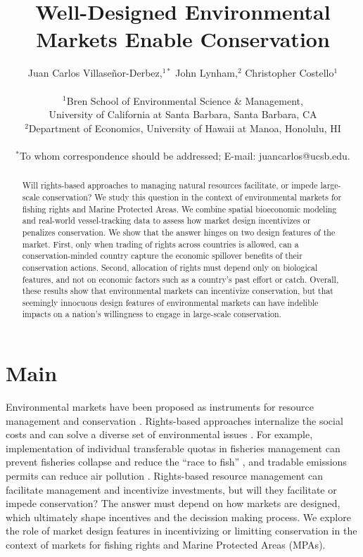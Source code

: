 \documentclass[12pt]{article}
\title{Well-Designed Environmental Markets Enable Conservation}
\author{Juan Carlos Villase\~{n}or-Derbez,$^{1\ast}$ John Lynham,$^{2}$ Christopher Costello$^{1}$\\
\\
\normalsize{$^{1}$Bren School of Environmental Science \& Management,}\\
\normalsize{University of California at Santa Barbara, Santa Barbara, CA}\\
\normalsize{$^{2}$Department of Economics, University of Hawaii at Manoa, Honolulu, HI}\\
\\
\normalsize{$^\ast$To whom correspondence should be addressed; E-mail: juancarlos@ucsb.edu.}
}
\date{}
\begin{document}

\baselineskip24pt


\maketitle



\begin{abstract}
Will rights-based approaches to managing natural resources facilitate, or impede large-scale conservation? We study this question in the context of environmental markets for fishing rights and Marine Protected Areas. We combine spatial bioeconomic modeling and real-world vessel-tracking data to assess how market design incentivizes or penalizes conservation. We show that the answer hinges on two design features of the market. First, only when trading of rights across countries is allowed, can a conservation-minded country capture the economic spillover benefits of their conservation actions. Second, allocation of rights must depend only on biological features, and not on economic factors such as a country's past effort or catch. Overall, these results show that environmental markets can incentivize conservation, but that seemingly innocuous design features of environmental markets can have indelible impacts on a nation's willingness to engage in large-scale conservation.
\end{abstract}

\clearpage

\section{Main}

Environmental markets have been proposed as instruments for resource management and conservation \cite{arsel_2012,sullivan_2013}. Rights-based approaches internalize the social costs and can solve a diverse set of environmental issues \cite{libecap_2009}. For example, implementation of individual transferable quotas in fisheries management can prevent fisheries collapse and reduce the ``race to fish'' \cite{costello_2008,birkenbach_2017}, and tradable emissions permits can reduce air pollution \cite{joskow_1998}. Rights-based resource management can facilitate management and incentivize investments, but will they facilitate or impede conservation? The answer must depend on how markets are designed, which ultimately shape incentives and the decission making process. We explore the role of market design features in incentivizing or limitting conservation in the context of markets for fishing rights and Marine Protected Areas (MPAs).
\end{document}
